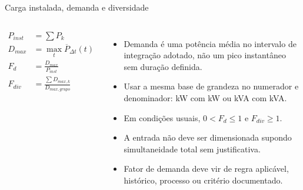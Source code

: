 \begin{frame}[shrink=8]{Carga instalada, demanda e diversidade}
\small
\begin{columns}[T,onlytextwidth]
\begin{align*}
P_{inst}&=\sum P_k\\
D_{max}&=\max_t\overline{P}_{\Delta t}(t)\\
F_d&=\frac{D_{max}}{P_{inst}}\\
F_{div}&=\frac{\sum D_{max,k}}{D_{max,grupo}}
\end{align*}
\begin{itemize}
\item Demanda é uma potência média no intervalo de integração adotado, não um pico instantâneo sem duração definida.
\item Usar a mesma base de grandeza no numerador e denominador: kW com kW ou kVA com kVA.
\item Em condições usuais, $0<F_d\le1$ e $F_{div}\ge1$.
\item A entrada não deve ser dimensionada supondo simultaneidade total sem justificativa.
\item Fator de demanda deve vir de regra aplicável, histórico, processo ou critério documentado.
\end{itemize}
\end{columns}
\end{frame}

